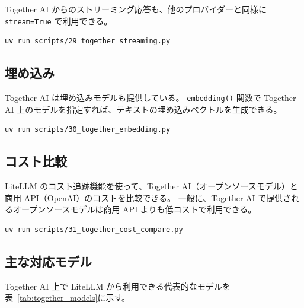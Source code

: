 \documentclass[a4paper,11pt]{ltjsarticle}
\newcommand{\code}[1]{\texttt{#1}}
\begin{document}
Together AI からのストリーミング応答も、他のプロバイダーと同様に \code{stream=True} で利用できる。



\begin{lstlisting}[style=bash]
uv run scripts/29_together_streaming.py
\end{lstlisting}

\subsection{埋め込み}
\label{subsec:together_embedding}

Together AI は埋め込みモデルも提供している。
\code{embedding()} 関数で Together AI 上のモデルを指定すれば、テキストの埋め込みベクトルを生成できる。



\begin{lstlisting}[style=bash]
uv run scripts/30_together_embedding.py
\end{lstlisting}

\subsection{コスト比較}
\label{subsec:together_cost}

LiteLLM のコスト追跡機能を使って、Together AI（オープンソースモデル）と商用 API（OpenAI）のコストを比較できる。
一般に、Together AI で提供されるオープンソースモデルは商用 API よりも低コストで利用できる。



\begin{lstlisting}[style=bash]
uv run scripts/31_together_cost_compare.py
\end{lstlisting}

\subsection{主な対応モデル}

Together AI 上で LiteLLM から利用できる代表的なモデルを表~\ref{tab:together_models}に示す。
\end{document}
